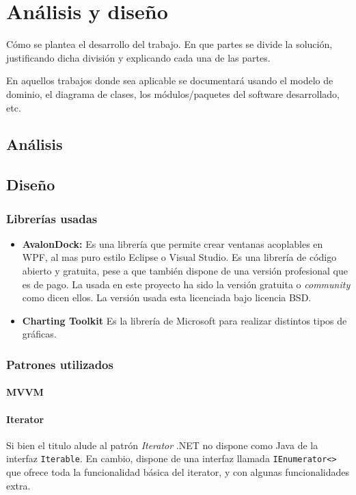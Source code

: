 \chapter{An\'{a}lisis y dise\~{n}o}
Cómo se plantea el desarrollo del trabajo. En que partes se 
divide la solución, justificando dicha división y explicando 
cada una de las partes.

En aquellos trabajos donde sea aplicable se documentará 
usando el modelo de dominio, el diagrama de clases, los 
módulos/paquetes del software desarrollado, etc.

\section{An\'{a}lisis}

\section{Dise\~{n}o}

\subsection{Librer\'{i}as usadas}
\begin{itemize}
    \item \textbf{AvalonDock:} 
    Es una librer\'{i}a que permite crear ventanas acoplables en WPF, al mas puro estilo Eclipse o Visual Studio. Es una librer\'{i}a de
    c\'{o}digo abierto y gratuita, pese a que tambi\'{e}n dispone de una versi\'{o}n profesional que es de pago. La usada en este proyecto
    ha sido la versi\'{o}n gratuita o \emph{community} como dicen ellos. La versi\'{o}n usada esta licenciada bajo licencia BSD.
    \item \textbf{Charting Toolkit}
    Es la librer\'{i}a de Microsoft para realizar distintos tipos de gr\'{a}ficas.
\end{itemize}

\subsection{Patrones utilizados}

\subsubsection{MVVM}

\subsubsection{Iterator}
Si bien el titulo alude al patr\'{o}n \emph{Iterator} .NET no dispone como Java de la interfaz \texttt{Iterable}.
En cambio, dispone de una interfaz llamada \texttt{IEnumerator<>} que ofrece toda la funcionalidad b\'{a}sica del iterator,
y con algunas funcionalidades extra.

